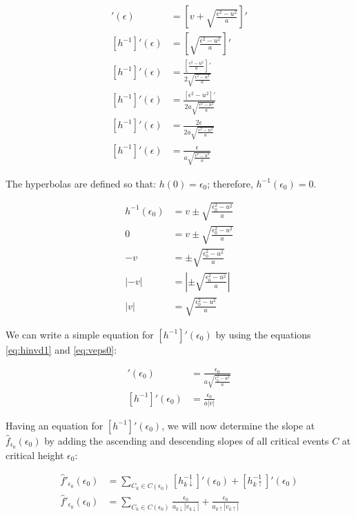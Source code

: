 \begin{align}
	[h^{-1}]'(\epsilon)  &= \left[ v + \sqrt{\frac{\epsilon^2 - u^2}{a}} \right]'\nonumber\\
	[h^{-1}]'(\epsilon) &= \left[\sqrt{\frac{\epsilon^2 - u^2}{a}} \right]'\nonumber\\
	[h^{-1}]'(\epsilon) &= \frac{ \left[ \frac{\epsilon^2 - u^2}{a} \right]' }{ 2\sqrt{\frac{\epsilon^2 - u^2}{a}} }\nonumber\\
	[h^{-1}]'(\epsilon) &= \frac{ \left[ \epsilon^2 - u^2 \right]' }{ 2a\sqrt{\frac{\epsilon^2 - u^2}{a}} }\nonumber\\
	[h^{-1}]'(\epsilon) &= \frac{ 2\epsilon }{ 2a\sqrt{\frac{\epsilon^2 - u^2}{a}} }\nonumber\\
	[h^{-1}]'(\epsilon)  &= \frac{ \epsilon }{ a\sqrt{\frac{\epsilon^2 - u^2}{a}} }\label{eq:hinvd1}
\end{align}

The hyperbolas are defined so that: $h(0) = \epsilon_0$; therefore, $h^{-1}(\epsilon_0) = 0$.

\begin{align}
	h^{-1}(\epsilon_0) &= v \pm \sqrt{\frac{\epsilon_0^2 - u^2}{a}}\nonumber\\
	0 &= v \pm \sqrt{\frac{\epsilon_0^2 - u^2}{a}}\nonumber\\
	-v &= \pm \sqrt{\frac{\epsilon_0^2 - u^2}{a}}\nonumber\\
	\left| -v \right| &= \left| \pm \sqrt{\frac{\epsilon_0^2 - u^2}{a}} \right|\nonumber\\
	\left| v \right| &= \sqrt{\frac{\epsilon_0^2 - u^2}{a}} \label{eq:veps0}
\end{align}

We can write a simple equation for $[h^{-1}]'(\epsilon_0)$ by using the equations \ref{eq:hinvd1} and \ref{eq:veps0}:

\begin{align}
	[h^{-1}]'(\epsilon_0)  &= \frac{ \epsilon_0 }{ a\sqrt{\frac{\epsilon_0^2 - u^2}{a}} }\nonumber\\
	[h^{-1}]'(\epsilon_0)  &= \frac{ \epsilon_0 }{ a \left| v \right| }\label{eq:hinvd1eps0}
\end{align}

Having an equation for $[h^{-1}]'(\epsilon_0)$, we will now determine the slope at $\hat{f}_{\epsilon_0}(\epsilon_0)$ by adding the ascending and descending slopes of all critical events $C$ at critical height $\epsilon_0$:

\begin{align*}
	\hat{f}'_{\epsilon_0}(\epsilon_0) &= \sum_{C_k \in C(\epsilon_0)} { [h_{k\downarrow}^{-1}]'(\epsilon_0) + [h_{k\uparrow}^{-1}]'(\epsilon_0)}\\
	\hat{f}'_{\epsilon_0}(\epsilon_0) &= \sum_{C_k \in C(\epsilon_0)} { \frac{\epsilon_0}{a_{k\downarrow} \left| v_{k\downarrow} \right|} + \frac{\epsilon_0}{a_{k\uparrow} \left| v_{k\uparrow} \right|}}
\end{align*}

